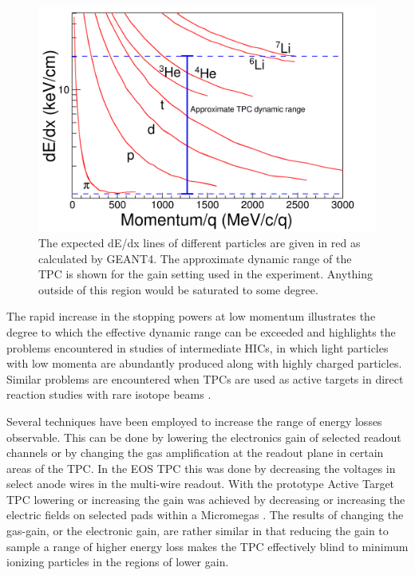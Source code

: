\documentclass[review]{elsarticle}
\begin{document}
  
\begin{figure}[ht!]
\includegraphics[width=\linewidth]{intrographic}
\caption{The expected dE/dx lines of different particles are given in red as calculated by GEANT4. The approximate dynamic range of the TPC is shown for the gain setting used in the experiment. Anything outside of this region would be saturated to some degree.}
\label{fig:intro}
\end{figure}

The rapid increase in the stopping powers at low momentum illustrates the degree to which the effective dynamic range can be exceeded and highlights the problems encountered in studies of intermediate HICs, in which light particles with low momenta are abundantly produced along with highly charged particles. Similar problems are encountered when TPCs are used as active targets in direct reaction studies with rare isotope beams \cite{pattpc}. 

Several techniques have been employed to increase the range of energy losses observable. This can be done by lowering the electronics gain of selected readout channels or by changing the gas amplification at the readout plane in certain areas of the TPC. In the EOS TPC \cite{eos} this was done by decreasing the voltages in select anode wires in the multi-wire readout. With the prototype Active Target TPC lowering or increasing the gain was achieved by decreasing or increasing the electric fields on selected pads within a Micromegas \cite{pattpc}. The results of changing the gas-gain, or the electronic gain, are rather similar in that reducing the gain to sample a range of higher energy loss makes the TPC effectively blind to minimum ionizing particles in  the regions of lower gain.
\end{document}
